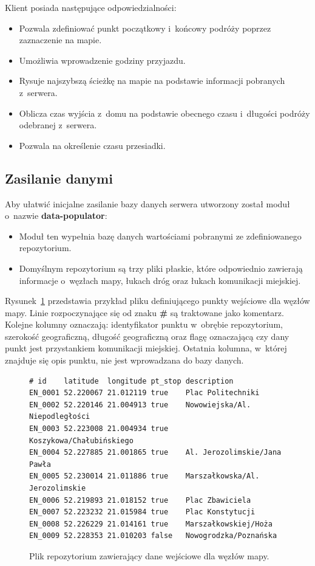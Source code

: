 \documentclass[a4paper,12pt]{article}
\begin{document}
	Klient posiada następujące odpowiedzialności:

	\begin{itemize}
		\item Pozwala zdefiniować punkt początkowy i~końcowy podróży poprzez zaznaczenie na mapie.
		\item Umożliwia wprowadzenie godziny przyjazdu.
		\item Rysuje najszybszą ścieżkę na mapie na podstawie informacji pobranych z~serwera.
		\item Oblicza czas wyjścia z~domu na podstawie obecnego czasu i~długości podróży odebranej z~serwera.
		\item Pozwala na określenie czasu przesiadki.
	\end{itemize}

	\subsection*{Zasilanie danymi}

	Aby ułatwić inicjalne zasilanie bazy danych serwera utworzony został moduł o~nazwie \textbf{data-populator}:

	\begin{itemize}
		\item Moduł ten wypełnia bazę danych wartościami pobranymi ze zdefiniowanego repozytorium.
		\item Domyślnym repozytorium są trzy pliki płaskie, które odpowiednio zawierają informacje o~węzłach mapy, łukach dróg oraz łukach komunikacji miejskiej.
	\end{itemize}

	Rysunek~\ref{vrb:entries_repository} przedstawia przykład pliku definiującego punkty wejściowe dla węzłów mapy. Linie rozpoczynające się od znaku \textbf{\#} są traktowane jako komentarz. Kolejne kolumny oznaczają: identyfikator punktu w~obrębie repozytorium, szerokość geograficzną, długość geograficzną oraz flagę oznaczającą czy dany punkt jest przystankiem komunikacji miejskiej. Ostatnia kolumna, w~której znajduje się opis punktu, nie jest wprowadzana do bazy danych.

	\begin{figure}[ht!]
		\centering
		\begin{BVerbatim}
# id    latitude  longitude pt_stop description 
EN_0001 52.220067 21.012119 true    Plac Politechniki
EN_0002 52.220146 21.004913 true    Nowowiejska/Al. Niepodległości
EN_0003 52.223008 21.004934 true    Koszykowa/Chałubińskiego
EN_0004 52.227885 21.001865 true    Al. Jerozolimskie/Jana Pawła
EN_0005 52.230014 21.011886 true    Marszałkowska/Al. Jerozolimskie
EN_0006 52.219893 21.018152 true    Plac Zbawiciela
EN_0007 52.223232 21.015984 true    Plac Konstytucji
EN_0008 52.226229 21.014161 true    Marszałkowskiej/Hoża
EN_0009 52.228353 21.010203 false   Nowogrodzka/Poznańska
		\end{BVerbatim}
		\caption{Plik repozytorium zawierający dane wejściowe dla węzłów mapy.}
		\label{vrb:entries_repository}
	\end{figure}
\end{document}
